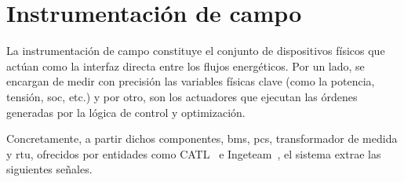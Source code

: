 \section{Instrumentación de campo}%
\label{makereference3.2}

La instrumentación de campo constituye el conjunto de dispositivos físicos que actúan como la interfaz directa entre los flujos energéticos. Por un lado, se encargan de medir con precisión las variables físicas clave (como la potencia, tensión, \gls{soc}, etc.) y por otro, son los actuadores que ejecutan las órdenes generadas por la lógica de control y optimización.

Concretamente, a partir dichos componentes, \gls{bms}, \gls{pcs}, transformador de medida y \gls{rtu}, ofrecidos por entidades como CATL~\cite{catl2023catl} e Ingeteam~\cite{ingeteam2025ingeteam}, el sistema extrae las siguientes señales.

